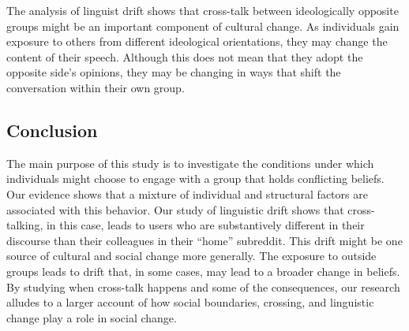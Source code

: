 \documentclass[letterpaper]{article}
\begin{document}
The analysis of linguist drift shows that cross-talk between ideologically opposite groups might be an important component of cultural change. As individuals gain exposure to others from different ideological orientations, they may change the content of their speech. Although this does not mean that they adopt the opposite side's opinions, they may be changing in ways that shift the conversation within their own group.

\subsection{Conclusion} 

The main purpose of this study is to investigate the conditions under which individuals might choose to engage with a group that holds conflicting beliefs. Our evidence shows that a mixture of individual and structural factors are associated with this behavior. Our study of linguistic drift shows that cross-talking, in this case, leads to users who are substantively different in their discourse than their colleagues in their ``home'' subreddit. This drift might be one source of cultural and social change more generally. The exposure to outside groups leads to drift that, in some cases, may lead to a broader change in beliefs. By studying when cross-talk happens and some of the consequences, our research alludes to a larger account of how social boundaries, crossing, and linguistic change play a role in social change.


\end{document}
